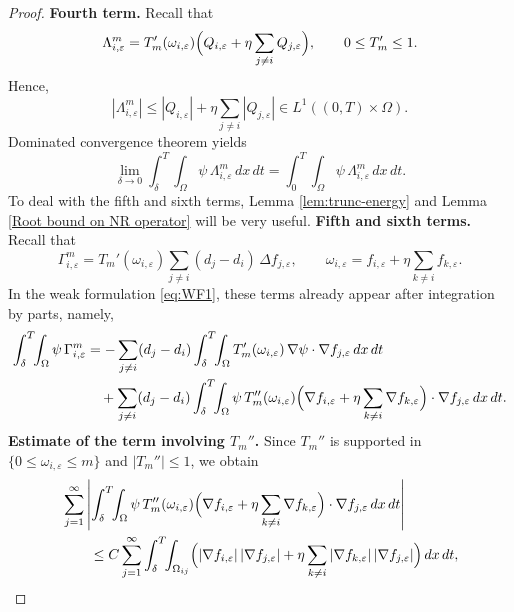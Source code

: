 \documentclass[a4paper,12pt,reqno]{amsart}
\theoremstyle{plain}
\numberwithin{equation}{section}
\begin{document}
\begin{proof}
		\medskip
		\noindent\textbf{Fourth term.}
		Recall that
		\[
		\Lambda^m_{i,\varepsilon}
		=
		T_m'(\omega_{i,\varepsilon})
		\Bigl(
		Q_{i,\varepsilon}
		+
		\eta \sum_{j\ne i} Q_{j,\varepsilon}
		\Bigr),
		\qquad
		0 \le T_m' \le 1 .
		\]
		Hence,
		\[
		|\Lambda^m_{i,\varepsilon}|
		\le
		|Q_{i,\varepsilon}|
		+
		\eta \sum_{j\ne i} |Q_{j,\varepsilon}|
		\in L^1((0,T)\times\Omega).
		\]
		Dominated convergence theorem yields
		\[
		\lim_{\delta\to0}
		\int_{\delta}^{T}\!\!\int_\Omega
		\psi\,\Lambda^m_{i,\varepsilon}\,dx\,dt
		=
		\int_{0}^{T}\!\!\int_\Omega
		\psi\,\Lambda^m_{i,\varepsilon}\,dx\,dt .
		\]
		To deal with the fifth and sixth terms, Lemma \ref{lem:trunc-energy} and Lemma \ref{Root bound on NR operator} will be very useful.
		\medskip
		\noindent\textbf{Fifth and sixth terms.}
		Recall that
		\[
		\Gamma^{m}_{i,\varepsilon}
		=
		T_m'(\omega_{i,\varepsilon})
		\sum_{j\ne i} (d_j-d_i)\,\Delta f_{j,\varepsilon},
		\qquad
		\omega_{i,\varepsilon}
		=
		f_{i,\varepsilon}
		+
		\eta \sum_{k\ne i} f_{k,\varepsilon}.
		\]
		In the weak formulation \eqref{eq:WF1}, these terms already appear after
		integration by parts, namely,
		\begin{align*}
			\int_{\delta}^{T}\!\!\int_{\Omega}
			\psi\,\Gamma^{m}_{i,\varepsilon}
			&=
			-\sum_{j\ne i}(d_j-d_i)
			\int_{\delta}^{T}\!\!\int_{\Omega}
			T_m'(\omega_{i,\varepsilon})\,
			\nabla\psi\cdot\nabla f_{j,\varepsilon}\,dx\,dt
			\\
			&\quad
			+
			\sum_{j\ne i}(d_j-d_i)
			\int_{\delta}^{T}\!\!\int_{\Omega}
			\psi\,
			T_m''(\omega_{i,\varepsilon})
			\Bigl(
			\nabla f_{i,\varepsilon}
			+
			\eta \sum_{k\ne i}\nabla f_{k,\varepsilon}
			\Bigr)\cdot\nabla f_{j,\varepsilon}\,dx\,dt .
		\end{align*}
		\medskip
		\textbf{Estimate of the term involving \(T_m''\).}
		Since \(T_m''\) is supported in \(\{0\le \omega_{i,\varepsilon}\le m\}\) and
		\(|T_m''|\le 1\), we obtain
		\begin{align*}
			&\sum_{j=1}^{\infty}
			\left|
			\int_{\delta}^{T}\!\!\int_{\Omega}
			\psi\,
			T_m''(\omega_{i,\varepsilon})
			\Bigl(
			\nabla f_{i,\varepsilon}
			+
			\eta \sum_{k\ne i}\nabla f_{k,\varepsilon}
			\Bigr)\cdot\nabla f_{j,\varepsilon}\,dx\,dt
			\right|
			\\
			&\qquad
			\le
			C\sum_{j=1}^{\infty}
			\int_{\delta}^{T}\!\!\int_{\Omega_{ij}}
			\Bigl(
			|\nabla f_{i,\varepsilon}|\,|\nabla f_{j,\varepsilon}|
			+
			\eta\sum_{k\ne i}
			|\nabla f_{k,\varepsilon}|\,|\nabla f_{j,\varepsilon}|
			\Bigr)\,dx\,dt,
		\end{align*}

\end{proof}
\end{document}
